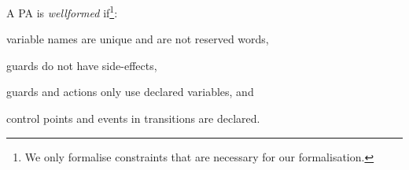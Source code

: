 
A PA is
\emph{wellformed} if\footnote{We only formalise constraints that are
necessary for our formalisation.}:
\begin{inparaenum}[(\itshape i\upshape)]
\item variable names are unique and are not reserved words,
\item guards do not have side-effects,
\item guards and actions only use declared variables, and
\item control points and events  in transitions are declared.
\end{inparaenum}


